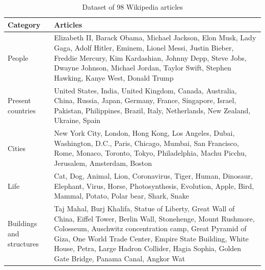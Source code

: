 \documentclass[12pt,oneside]{memoir}
\begin{document}
\begin{table}[ht]
    \centering
    \begin{tabular}{p{1in}p{3.8in}}
        \toprule
        \textbf{Category} & \textbf{Articles} \\
        \midrule
        People & Elizabeth II, Barack Obama, Michael Jackson, Elon Musk, Lady Gaga, Adolf Hitler, Eminem, Lionel Messi, Justin Bieber, Freddie Mercury, Kim Kardashian, Johnny Depp, Steve Jobs, Dwayne Johnson, Michael Jordan, Taylor Swift, Stephen Hawking, Kanye West, Donald Trump\\
        \midrule
        Present countries & United States, India, United Kingdom, Canada, Australia, China, Russia, Japan, Germany, France, Singapore, Israel, Pakistan, Philippines, Brazil, Italy, Netherlands, New Zealand, Ukraine, Spain\\
        \midrule
        Cities & New York City, London, Hong Kong, Los Angeles, Dubai, Washington, D.C., Paris, Chicago, Mumbai, San Francisco, Rome, Monaco, Toronto, Tokyo, Philadelphia, Machu Picchu, Jerusalem, Amsterdam, Boston\\
        \midrule
        Life & Cat, Dog, Animal, Lion, Coronavirus, Tiger, Human, Dinosaur, Elephant, Virus, Horse, Photosynthesis, Evolution, Apple, Bird, Mammal, Potato, Polar bear, Shark, Snake\\
        \midrule
        Buildings and structures & Taj Mahal, Burj Khalifa, Statue of Liberty, Great Wall of China, Eiffel Tower, Berlin Wall, Stonehenge, Mount Rushmore, Colosseum, Auschwitz concentration camp, Great Pyramid of Giza, One World Trade Center, Empire State Building, White House, Petra, Large Hadron Collider, Hagia Sophia, Golden Gate Bridge, Panama Canal, Angkor Wat\\
        \bottomrule
    \end{tabular}
    \caption{Dataset of 98 Wikipedia articles}
    \label{table:dataset}
\end{table}
\end{document}
